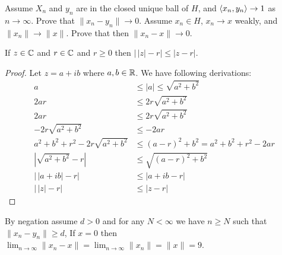 \begin{enumerate}
\begin{excopy}
\begin{itemize}
Assume \(X_n\) and \(y_n\) are in the closed unique ball of $H$,
and \(\langle x_n, y_n \rangle \to 1\) as \(n\to\infty\).
Prove that \(\|x_n -y_n\| \to 0\).
Assume \(x_n\in H\), \(x_n\to x\) weakly, and \(\|x_n\| \to \|x\|\).
Prove that then \(\|x_n - x\|\to 0\).
\end{itemize}
\end{excopy}

\begin{llem} \label{llem:mindist-z-real}
If \(z\in\mathbb{C}\) and \(r\in\mathbb{C}\) and \(r\geq 0\)
then \(\left|\,|z| - r\right| \leq |z-r|\). 
\end{llem}
\begin{proof}
Let \(z = a+ib\) where \(a,b\in\mathbb{R}\). We have following derivations:
\begin{align*}
a &\leq |a| \leq \sqrt{a^2+b^2} \\
2ar &\leq 2r\sqrt{a^2+b^2} \\
2ar &\leq 2r\sqrt{a^2+b^2} \\
- 2r\sqrt{a^2+b^2} &\leq - 2ar \\
a^2+b^2+r^2 - 2r\sqrt{a^2+b^2} &\leq (a-r)^2+b^2 = a^2+b^2+r^2 - 2ar \\
\left|\sqrt{a^2+b^2} - r\right| &\leq \sqrt{(a-r)^2+b^2} \\
\left|\,|a + ib| - r\right| &\leq |a+ib-r| \\
\left|\,|z| - r\right| &\leq |z-r|
\end{align*}
\end{proof}

\begin{itemize}
By negation assume \(d > 0\) and for any \(N<\infty\) we have \(n\geq N\)
such that \(\|x_n - y_n\| \geq d\),
\unfinished
{}
If \(x=0\) then \(\lim_{n\to\infty}\|x_n - x\| = \lim_{n\to\infty}\|x_n\| = \|x\|=9\).
\end{itemize}

\unfinished

\end{enumerate}


